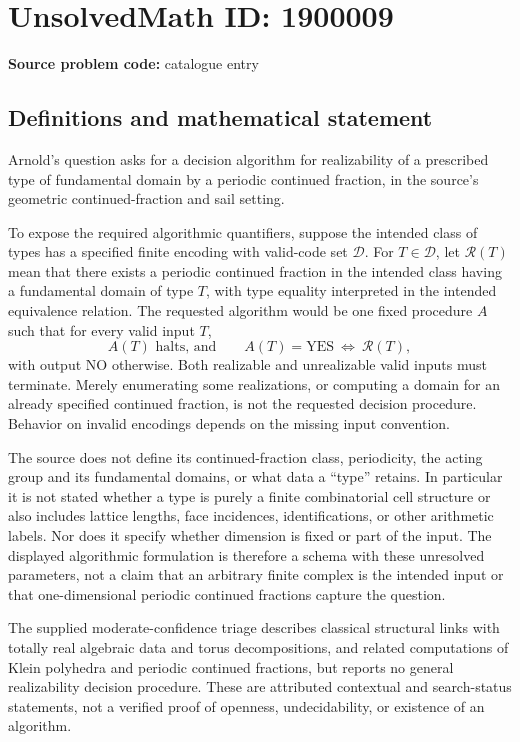 \documentclass[11pt]{article}
\begin{document}
\section*{UnsolvedMath ID: 1900009}
\textbf{Source problem code:} catalogue entry
\subsection{Definitions and mathematical statement}
Arnold's question asks for a decision algorithm for realizability of a prescribed type of fundamental domain by a periodic continued fraction, in the source's geometric continued-fraction and sail setting.

To expose the required algorithmic quantifiers, suppose the intended class of types has a specified finite encoding with valid-code set $\mathcal D$. For $T\in\mathcal D$, let $\mathcal R(T)$ mean that there exists a periodic continued fraction in the intended class having a fundamental domain of type $T$, with type equality interpreted in the intended equivalence relation. The requested algorithm would be one fixed procedure $A$ such that for every valid input $T$,
\[
A(T)\text{ halts, and}\qquad
A(T)=\mathrm{YES}\ \Longleftrightarrow\ \mathcal R(T),
\]
with output $\mathrm{NO}$ otherwise. Both realizable and unrealizable valid inputs must terminate. Merely enumerating some realizations, or computing a domain for an already specified continued fraction, is not the requested decision procedure. Behavior on invalid encodings depends on the missing input convention.

The source does not define its continued-fraction class, periodicity, the acting group and its fundamental domains, or what data a ``type'' retains. In particular it is not stated whether a type is purely a finite combinatorial cell structure or also includes lattice lengths, face incidences, identifications, or other arithmetic labels. Nor does it specify whether dimension is fixed or part of the input. The displayed algorithmic formulation is therefore a schema with these unresolved parameters, not a claim that an arbitrary finite complex is the intended input or that one-dimensional periodic continued fractions capture the question.

The supplied moderate-confidence triage describes classical structural links with totally real algebraic data and torus decompositions, and related computations of Klein polyhedra and periodic continued fractions, but reports no general realizability decision procedure. These are attributed contextual and search-status statements, not a verified proof of openness, undecidability, or existence of an algorithm.
\end{document}
